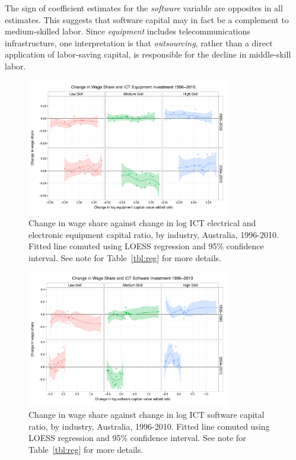The sign of coefficient estimates for the {\em software} variable are opposites in all estimates. This suggests that software capital may in fact be a complement to medium-skilled labor. Since {\em equipment} includes telecommunications infrastructure, one interpretation is that {\em outsourcing}, rather than a direct application of labor-saving capital, is responsible for the decline in middle-skill labor.

\begin{figure}
  \centering
  \includegraphics[width=0.8\textwidth]{../figure/wage_share_equipment_skill_split.pdf}
  \caption{Change in wage share against change in log ICT electrical and electronic equipment capital ratio, by industry, Australia, 1996-2010.
    Fitted line comuted using LOESS regression and 95\% confidence interval. See note for Table~\ref{tbl:reg} for more details.
  }
  \label{fig:equip}
\end{figure}

\begin{figure}
  \centering
  \includegraphics[width=0.8\textwidth]{../figure/wage_share_software_skill_split.pdf}
  \caption{Change in wage share against change in log ICT software capital ratio, by industry, Australia, 1996-2010. Fitted line comuted using LOESS regression and 95\% confidence interval.
    See note for Table~\ref{tbl:reg} for more details.
  }
  \label{fig:soft}
\end{figure}


